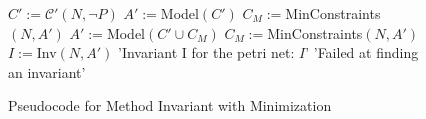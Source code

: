 \begin{figure}
  \begin{algorithmic}[1]
    \State $C' := \mathcal C'(N, \neg P)$
    \State $A' := $Model$(C')$
    \State $C_M := $MinConstraints$(N, A')$
    \State $A' := $Model$(C' \cup C_M)$
    \State $C_M := $MinConstraints$(N, A')$
    \EndWhile
    \State $I := $Inv$(N, A')$
    \State \Return 'Invariant I for the petri net: $I$'
    \Else
    \State \Return 'Failed at finding an invariant'
    \EndIf
  \end{algorithmic}
  \caption{Pseudocode for Method Invariant with Minimization}
  \label{fig:method-invariant-with-minimization-pseudocode}
\end{figure}


